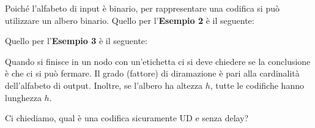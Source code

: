 Poiché l'alfabeto di input è binario, per rappresentare una codifica si può utilizzare un albero binario. Quello per l'\textbf{Esempio 2} è il seguente:
\begin{center}
\end{center}
Quello per l'\textbf{Esempio 3} è il seguente: %
\begin{center}
\end{center}
Quando si finisce in un nodo con un'etichetta ci si deve chiedere se la conclusione è che ci si può fermare. Il grado (fattore) di diramazione è pari alla cardinalità dell'alfabeto di output. Inoltre, se l'albero ha altezza $h$, tutte le codifiche hanno lunghezza $h$.

Ci chiediamo, qual è una codifica sicuramente UD e senza delay?

